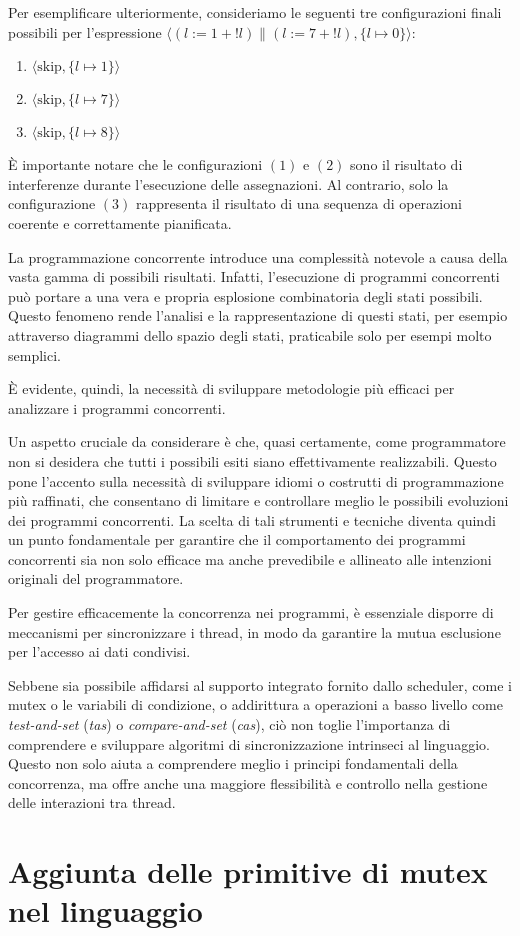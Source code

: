 Per esemplificare ulteriormente, consideriamo le seguenti tre configurazioni
finali possibili per l'espressione \( \langle (l := 1 + !l) \parallel (l := 7 + !l),
\{ l \mapsto 0 \} \rangle \):
\begin{enumerate}
    \item \( \langle \text{skip}, \{ l \mapsto 1 \} \rangle \)
    \item \( \langle \text{skip}, \{ l \mapsto 7 \} \rangle \)
    \item \( \langle \text{skip}, \{ l \mapsto 8 \} \rangle \)
\end{enumerate}
È importante notare che le configurazioni $(1)$ e $(2)$ sono il risultato di
interferenze durante l'esecuzione delle assegnazioni. Al contrario, solo la
configurazione $(3)$ rappresenta il risultato di una sequenza di operazioni
coerente e correttamente pianificata.

La programmazione concorrente introduce una complessità notevole a causa della
vasta gamma di possibili risultati. Infatti, l'esecuzione di programmi concorrenti
può portare a una vera e propria esplosione combinatoria degli stati possibili.
Questo fenomeno rende l'analisi e la rappresentazione di questi stati, per esempio
attraverso diagrammi dello spazio degli stati, praticabile solo per
esempi molto semplici. 

È evidente, quindi, la necessità di sviluppare metodologie più efficaci per
analizzare i programmi concorrenti.

Un aspetto cruciale da considerare è che, quasi certamente, come programmatore
non si desidera che tutti i possibili esiti siano effettivamente realizzabili.
Questo pone l'accento sulla necessità di sviluppare idiomi o costrutti di
programmazione più raffinati, che consentano di limitare e controllare meglio
le possibili evoluzioni dei programmi concorrenti. La scelta di tali strumenti
e tecniche diventa quindi un punto fondamentale per garantire che il comportamento
dei programmi concorrenti sia non solo efficace ma anche prevedibile e allineato
alle intenzioni originali del programmatore.

Per gestire efficacemente la concorrenza nei programmi, è essenziale disporre
di meccanismi per sincronizzare i thread, in modo da garantire la mutua esclusione
per l'accesso ai dati condivisi. 

Sebbene sia possibile affidarsi al supporto integrato fornito dallo scheduler,
come i mutex o le variabili di condizione, o addirittura a operazioni a basso
livello come \textit{test-and-set} (\textit{tas}) o \textit{compare-and-set}
(\textit{cas}), ciò non toglie l'importanza di comprendere e sviluppare algoritmi di
sincronizzazione intrinseci al linguaggio. Questo non solo aiuta a comprendere
meglio i principi fondamentali della concorrenza, ma offre anche una maggiore
flessibilità e controllo nella gestione delle interazioni tra thread.
\section{Aggiunta delle primitive di mutex nel linguaggio}
